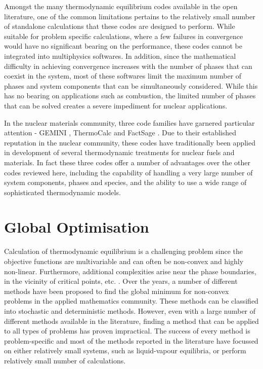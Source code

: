 	Amongst the many thermodynamic equilibrium codes available in the open literature, one of the common limitations pertains to the relatively small number of standalone calculations that these codes are designed to perform. While suitable for problem specific calculations, where a few failures in convergence would have no significant bearing on the performance, these codes cannot be integrated into multiphysics softwares. In addition, since the mathematical difficulty in achieving convergence increases with the number of phases that can coexist in the system, most of these softwares  limit the maximum number of phases and system components that can be simultaneously considered. While this has no bearing on applications such as combustion, the limited number of phases that can be solved creates a severe impediment for nuclear applications.

	In the nuclear materials community, three code families have garnered particular attention - GEMINI \cite{Cheynet09}, ThermoCalc \cite{ANDERSSON2002273} and FactSage \cite{Bale02}. Due to their established reputation in the nuclear community, these codes have traditionally been applied in development of several thermodynamic treatments for nuclear fuels and materials. In fact these three codes offer a number of advantages over the other codes reviewed here, including the capability of handling a very large number of system components, phases and species, and the ability to use a wide range of sophisticated thermodynamic models.

	\section{Global Optimisation}
	Calculation of thermodynamic equilibrium is a challenging problem since the objective functions are multivariable and can often be non-convex and highly non-linear. Furthermore, additional complexities arise near the phase boundaries, in the vicinity of critical points, etc. \cite{Wakeham04,TEH2002745}. Over the years, a number of different methods have been proposed to find the global minimum for non-convex problems in the applied mathematics community. These methods can be classified into stochastic and deterministic methods. However, even with a large number of different methods available in the literature, finding a method that can be applied to all types of problems has proven impractical. The success of every method is problem-specific and most of the methods reported in the literature have focussed on either relatively small systems, such as liquid-vapour equilibria, or perform relatively small number of calculations.

